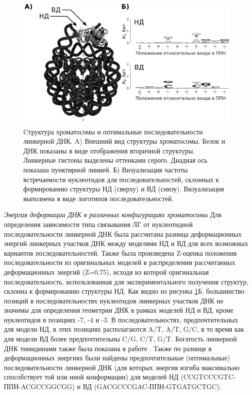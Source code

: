    \begin{figure} [H]
    \centering
    \includegraphics[width=\textwidth]{images/p6/p6_5/p6_5_f1.png}
    \caption[Cтруктура хроматосомы и оптимальные последовательности линкерной ДНК.]{Cтруктура хроматосомы и оптимальные последовательности линкерной ДНК. A) Внешний вид структуры хроматосомы. Белок и ДНК показаны в виде отображения вторичной структуры. Линкерные гистоны выделены оттенками серого. Диадная ось показана пунктирной линией.
Б) Визуализация частоты встречаемости нуклеотидов для последовательностей, склонных к формированию структуры НД (сверху) и ВД (снизу). Визуализация выполнена в виде логотипов последовательностей.
}
    \label{fig:p6_5_f1}
\end{figure}

\emph{Энергия деформации ДНК в различных конфигурациях хроматосомы}
Для определения зависимости типа связывания ЛГ от нуклеотидной последовательности линкерной ДНК была рассчитана разница деформационных энергий линкерных участков ДНК между моделями НД и ВД для всех возможных вариантов последовательностей. Также была произведена Z-оценка положения последовательности из оригинальных моделей в распределении рассчитанных деформационных энергий (Z=0,75), исходя из которой оригинальная последовательность, использованная для экспериментального получения структур, склонна к формированию структуры НД.
Как видно из рисунка \ref{fig:p6_5_f1}Б, большинство позиций в последовательностях нуклеотидов линкерных участков ДНК не значимы для определения геометрии ДНК в рамках моделей НД и ВД, кроме нуклеотидов в позициях -7, -4 и -3. В последовательностях, предпочтительных для модели НД, в этих позициях располагаются A/T, A/T, G/C, в то время как для модели ВД более предпочтительны  C/G, C/T, G/T. Богатость линкерной ДНК тимидинами также была показана в работе \cite{cui_distinctive_2009}.
Также по разнице в деформационных энергиях были найдены предпочтительные (оптимальные) последовательности линкерной ДНК (для которых энергия изгиба максимально способствует той или иной конформации) для моделей НД (CCGTCCCGTC-ППН-ACGCCGGCGG) и ВД (GACGCCCGAC-ППН-GTGATGCTGC). 

